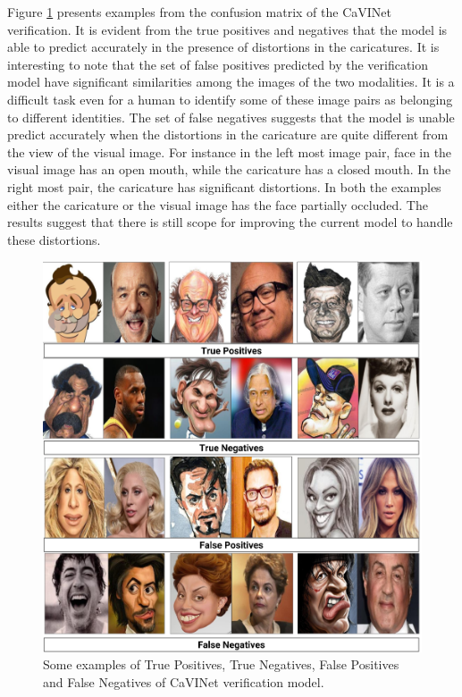 Figure \ref{fig:examples} presents examples from the confusion matrix of the CaVINet verification. It is evident from the true positives and negatives that the model is able to predict accurately in the presence of distortions in the caricatures. It is interesting to note that the set of false positives predicted by the verification model have significant similarities among the images of the two modalities. It is a difficult task even for a human to identify some of these image pairs as belonging to different identities. The set of false negatives suggests that the model is unable predict accurately when the distortions in the caricature are quite different from the view of the visual image. For instance in the left most image pair, face in the visual image has an open mouth, while the caricature has a closed mouth. In the right most pair, the caricature has significant distortions. In both the examples either the caricature or the visual image has the face partially occluded. The results suggest that there is still scope for improving the current model to handle these distortions.

\begin{figure}[!h]
\centering
\includegraphics[scale=0.15]{images/examples.png}
\caption{Some examples of True Positives, True Negatives, False Positives and False Negatives of CaVINet verification model.}
\label{fig:examples}
\vspace{-2mm}
\end{figure}

